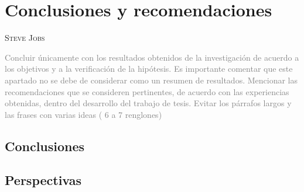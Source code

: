 \chapter{Conclusiones y recomendaciones}
              {\textsc{Steve Jobs}}
              
\textcolor{gray}{Concluir únicamente con los resultados obtenidos de la investigación de acuerdo a los objetivos y a la verificación de la hipótesis. Es importante comentar que este apartado no se debe de considerar como un resumen de resultados. Mencionar las recomendaciones que se consideren pertinentes, de acuerdo con las experiencias obtenidas, dentro del desarrollo del trabajo de tesis. Evitar los párrafos largos y las frases con varias ideas ( 6 a 7 renglones)}              

\section{Conclusiones}
\lipsum[1-3]

\section{Perspectivas}
\lipsum[1]